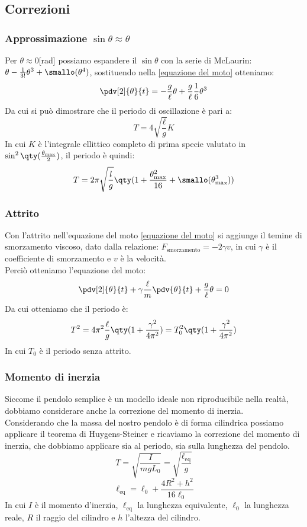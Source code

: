 \subsection{Correzioni}\label{correzioni}
\subsubsection*{Approssimazione \texorpdfstring{$\sin\theta\approx\theta$}{sin(x) = x}}
Per $\theta \approx 0$[rad] possiamo espandere il $\sin \theta$ con la serie di McLaurin: $\theta - \frac{1}{3!}\theta^3 + \smallo(\theta^4)$, sostituendo nella \eqref{equazione del moto} otteniamo:
$$    \pdv[2]{\theta}{t} = -\frac{g}{\ell}\theta + \frac{g}{\ell}\frac{1}{6}\theta^3$$
Da cui si può dimostrare che il periodo di oscillazione è pari a:
$$T = 4 \sqrt{\frac{\ell}{g}}K$$
In cui $K$ è l'integrale ellittico completo di prima specie valutato in $\sin^2\qty(\frac{\theta_\text{max}}{2})$, il periodo è quindi:
$$ T = 2\pi \sqrt{\frac{l}{g}}\qty(1+\frac{\theta_\text{max}^2}{16} + \smallo(\theta_\text{max}^3))$$

\subsubsection*{Attrito}
Con l'attrito nell'equazione del moto \eqref{equazione del moto} si aggiunge il temine di smorzamento viscoso, dato dalla relazione: $F_\text{smorzamento} = -2\gamma v$, in cui $\gamma$ è il coefficiente di smorzamento e $v$ è la velocità.\\ 
Perciò otteniamo l'equazione del moto:
$$\pdv[2]{\theta}{t} +\gamma\frac{\ell}{m}\pdv{\theta}{t} + \frac{g}{\ell} \theta = 0$$
Da cui otteniamo che il periodo è:
$$T^2 = 4\pi^2 \frac{\ell}{g} \qty(1 + \frac{\gamma^2}{4\pi^2}) = T_0^2\qty(1 + \frac{\gamma^2}{4\pi^2})$$
In cui $T_0$ è il periodo senza attrito.

\subsubsection*{Momento di inerzia}
Siccome il pendolo semplice è un modello ideale non riproducibile nella realtà, dobbiamo considerare anche la correzione del momento di inerzia.\\
Considerando che la massa del nostro pendolo è di forma cilindrica possiamo applicare il teorema di Huygens-Steiner e ricaviamo la correzione del momento di inerzia, che dobbiamo applicare sia al periodo, sia sulla lunghezza del pendolo.\\
$$T = \sqrt{\frac{I}{mgL_0}} = \sqrt{\frac{\ell_\text{eq}}{g}}$$
$$\ell_\text{eq} = \ell_0 + \frac{4R^2 + h^2}{16\ell_0}$$
In cui $I$ è il momento d'inerzia, $\ell_\text{eq}$ la lunghezza equivalente, $\ell_0$ la lunghezza reale, $R$ il raggio del cilindro e $h$ l'altezza del cilindro.

